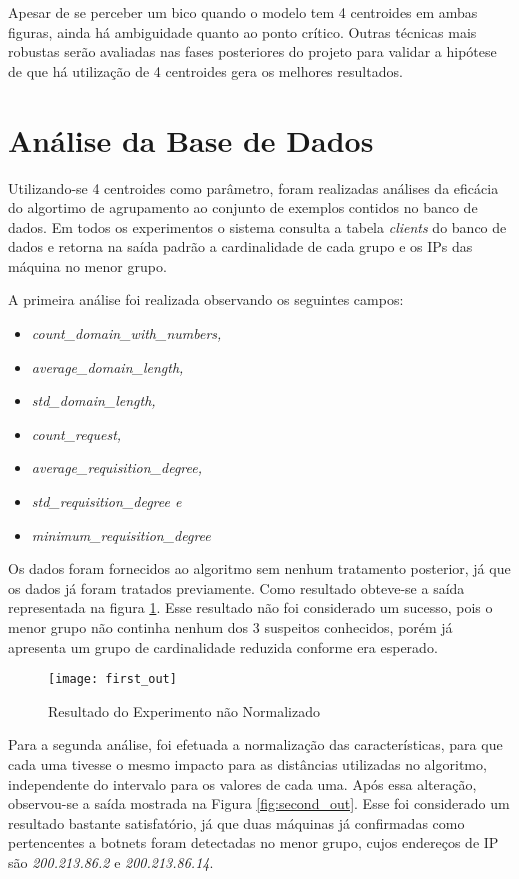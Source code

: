 Apesar de se perceber um bico quando o modelo tem 4 centroides em ambas figuras, ainda há ambiguidade quanto ao ponto crítico. Outras técnicas mais robustas serão avaliadas nas fases posteriores do projeto para validar a hipótese de que há utilização de 4 centroides gera os melhores resultados.

\section{Análise da Base de Dados}

Utilizando-se 4 centroides como parâmetro, foram realizadas análises da eficácia do algortimo de agrupamento ao conjunto de exemplos contidos no banco de dados. Em todos os experimentos o sistema consulta a tabela \textit{clients} do banco de dados e retorna na saída padrão a cardinalidade de cada grupo e os IPs das máquina no menor grupo.

A primeira análise foi realizada observando os seguintes campos:

\begin{itemize}
\item \textit{count\_domain\_with\_numbers, }
\item \textit{average\_domain\_length, }
\item \textit{std\_domain\_length, }
\item \textit{count\_request, }
\item \textit{average\_requisition\_degree, }
\item \textit{std\_requisition\_degree e }
\item \textit{minimum\_requisition\_degree }
\end{itemize}

Os dados foram fornecidos ao algoritmo sem nenhum tratamento posterior, já que os dados já foram tratados previamente. Como resultado obteve-se a saída representada na figura \ref{fig:first_out}. Esse resultado não foi considerado um sucesso, pois o menor grupo não continha nenhum dos 3 suspeitos conhecidos, porém já apresenta um grupo de cardinalidade reduzida conforme era esperado.

\begin{figure}[htbp]
\centering
\texttt{[image: first\_out]}
\caption[Resultado do Experimento não Normalizado]{Resultado do Experimento não Normalizado} \label{fig:first_out}
\end{figure}

Para a segunda análise, foi efetuada a normalização das características, para que cada uma tivesse o mesmo impacto para as distâncias utilizadas no algoritmo, independente do intervalo para os valores de cada uma. Após essa alteração, observou-se a saída mostrada na Figura \ref{fig:second_out}. Esse foi considerado um resultado bastante satisfatório, já que duas máquinas já confirmadas como pertencentes a botnets foram detectadas no menor grupo, cujos endereços de IP são \textit{200.213.86.2} e \textit{200.213.86.14}.

